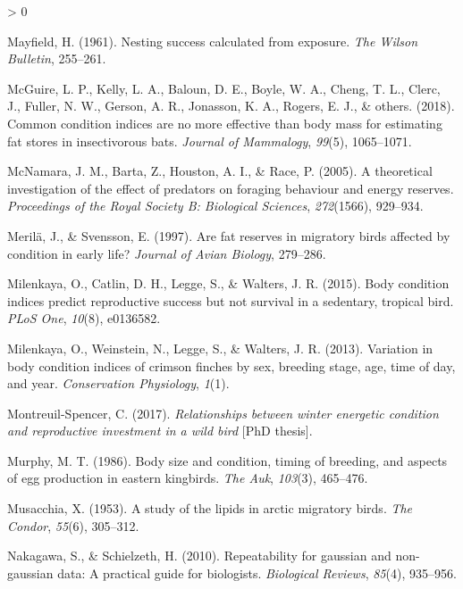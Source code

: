 \documentclass[
]{article}
\newlength{\cslhangindent}
\newenvironment{CSLReferences}[2] %
 {%
  \setlength{\parindent}{0pt}
  \ifodd #1 \everypar{\setlength{\hangindent}{\cslhangindent}}\ignorespaces\fi
  \ifnum #2 > 0
  \setlength{\parskip}{#2\baselineskip}
  \fi
 }%
 {}
\begin{document}
\begin{CSLReferences}{1}{0}
\leavevmode\hypertarget{ref-mayfield1961nesting}{}%
Mayfield, H. (1961). Nesting success calculated from exposure. \emph{The
Wilson Bulletin}, 255--261.

\leavevmode\hypertarget{ref-mcguire2018common}{}%
McGuire, L. P., Kelly, L. A., Baloun, D. E., Boyle, W. A., Cheng, T. L.,
Clerc, J., Fuller, N. W., Gerson, A. R., Jonasson, K. A., Rogers, E. J.,
\& others. (2018). Common condition indices are no more effective than
body mass for estimating fat stores in insectivorous bats. \emph{Journal
of Mammalogy}, \emph{99}(5), 1065--1071.

\leavevmode\hypertarget{ref-mcnamara2005theoretical}{}%
McNamara, J. M., Barta, Z., Houston, A. I., \& Race, P. (2005). A
theoretical investigation of the effect of predators on foraging
behaviour and energy reserves. \emph{Proceedings of the Royal Society B:
Biological Sciences}, \emph{272}(1566), 929--934.

\leavevmode\hypertarget{ref-merila1997fat}{}%
Merilä, J., \& Svensson, E. (1997). Are fat reserves in migratory birds
affected by condition in early life? \emph{Journal of Avian Biology},
279--286.

\leavevmode\hypertarget{ref-milenkaya2015body}{}%
Milenkaya, O., Catlin, D. H., Legge, S., \& Walters, J. R. (2015). Body
condition indices predict reproductive success but not survival in a
sedentary, tropical bird. \emph{PLoS One}, \emph{10}(8), e0136582.

\leavevmode\hypertarget{ref-milenkaya2013variation}{}%
Milenkaya, O., Weinstein, N., Legge, S., \& Walters, J. R. (2013).
Variation in body condition indices of crimson finches by sex, breeding
stage, age, time of day, and year. \emph{Conservation Physiology},
\emph{1}(1).

\leavevmode\hypertarget{ref-montreuil2017relationships}{}%
Montreuil-Spencer, C. (2017). \emph{Relationships between winter
energetic condition and reproductive investment in a wild bird} {[}PhD
thesis{]}.

\leavevmode\hypertarget{ref-murphy1986body}{}%
Murphy, M. T. (1986). Body size and condition, timing of breeding, and
aspects of egg production in eastern kingbirds. \emph{The Auk},
\emph{103}(3), 465--476.

\leavevmode\hypertarget{ref-musacchia1953study}{}%
Musacchia, X. (1953). A study of the lipids in arctic migratory birds.
\emph{The Condor}, \emph{55}(6), 305--312.

\leavevmode\hypertarget{ref-nakagawa2010repeatability}{}%
Nakagawa, S., \& Schielzeth, H. (2010). Repeatability for gaussian and
non-gaussian data: A practical guide for biologists. \emph{Biological
Reviews}, \emph{85}(4), 935--956.


\end{CSLReferences}
\end{document}
